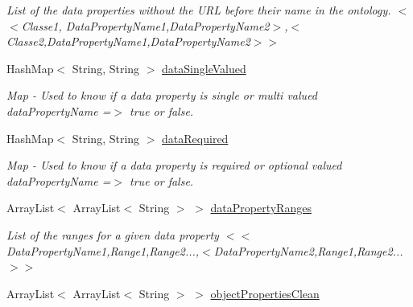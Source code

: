 \begin{DoxyCompactItemize}
\begin{DoxyCompactList}\small\item\em List of the data properties without the URL before their name in the ontology.  $<$$<$Classe1, DataPropertyName1,DataPropertyName2$>$,$<$Classe2,DataPropertyName1,DataPropertyName2$>$$>$ \end{DoxyCompactList}\item 
\hypertarget{class_data_base_1_1_tables_a40e2a6f8f60048f0a393e9d03e8fcfd8}{
HashMap$<$ String, String $>$ \hyperlink{class_data_base_1_1_tables_a40e2a6f8f60048f0a393e9d03e8fcfd8}{dataSingleValued}}
\label{class_data_base_1_1_tables_a40e2a6f8f60048f0a393e9d03e8fcfd8}

\begin{DoxyCompactList}\small\item\em Map -\/ Used to know if a data property is single or multi valued  dataPropertyName =$>$ true or false. \end{DoxyCompactList}\item 
\hypertarget{class_data_base_1_1_tables_af968a71b80946ad236d287dad7a68774}{
HashMap$<$ String, String $>$ \hyperlink{class_data_base_1_1_tables_af968a71b80946ad236d287dad7a68774}{dataRequired}}
\label{class_data_base_1_1_tables_af968a71b80946ad236d287dad7a68774}

\begin{DoxyCompactList}\small\item\em Map -\/ Used to know if a data property is required or optional valued  dataPropertyName =$>$ true or false. \end{DoxyCompactList}\item 
\hypertarget{class_data_base_1_1_tables_ac4fac81e62e9331f412a2ede3ddcc502}{
ArrayList$<$ ArrayList$<$ String $>$ $>$ \hyperlink{class_data_base_1_1_tables_ac4fac81e62e9331f412a2ede3ddcc502}{dataPropertyRanges}}
\label{class_data_base_1_1_tables_ac4fac81e62e9331f412a2ede3ddcc502}

\begin{DoxyCompactList}\small\item\em List of the ranges for a given data property  $<$$<$DataPropertyName1,Range1,Range2...,$<$DataPropertyName2,Range1,Range2...$>$$>$ \end{DoxyCompactList}\item 
\hypertarget{class_data_base_1_1_tables_aefcb4c8a578671a32a64c3196281f479}{
ArrayList$<$ ArrayList$<$ String $>$ $>$ \hyperlink{class_data_base_1_1_tables_aefcb4c8a578671a32a64c3196281f479}{objectPropertiesClean}}
\label{class_data_base_1_1_tables_aefcb4c8a578671a32a64c3196281f479}


\end{DoxyCompactItemize}
